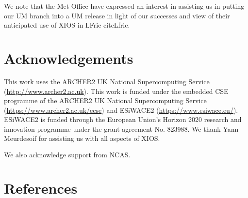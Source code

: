 \documentclass[twocolumn, 12pt]{paper}
\begin{document}
We note that the Met Office have expressed an interest in assisting us in putting our UM branch into a UM release in light of our successes and view of their anticipated use of XIOS in LFric cite{Lfric}.





\clearpage

\section*{Acknowledgements}

This work uses the ARCHER2 UK National Supercomputing Service (\url{http://www.archer2.ac.uk}).
This work is funded under the embedded CSE programme of the ARCHER2 UK National Supercomputing Service (\url{https://www.archer2.ac.uk/ecse}) and ESiWACE2 (\url{https://www.esiwace.eu/}). ESiWACE2 is funded through the European Union's Horizon 2020 research and innovation programme under the grant agreement No. 823988.
We thank Yann Meurdesoif for assisting us with all aspects of XIOS.


We also acknowledge support from NCAS.

\section*{References}



\end{document}
